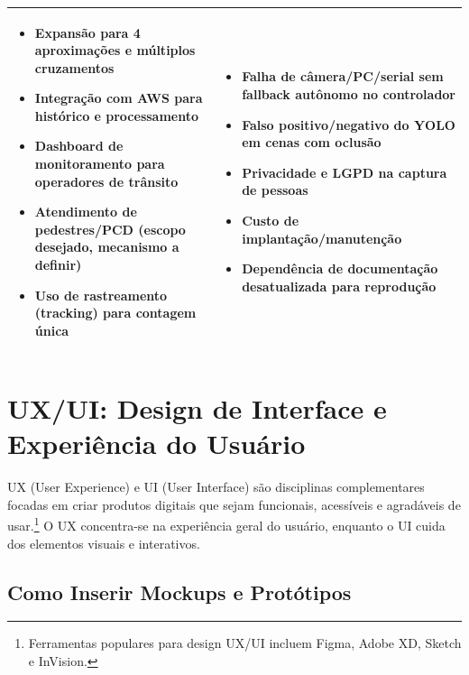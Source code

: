 \documentclass[11pt,a4paper]{article}
\begin{document}
\begin{table}[H]
\begin{tabular}{|p{7.2cm}|p{7.2cm}|}
\hline
\begin{minipage}[t]{7cm}
\begin{itemize}
    \item Expansão para 4 aproximações e múltiplos cruzamentos
    \item Integração com AWS para histórico e processamento
    \item Dashboard de monitoramento para operadores de trânsito
    \item Atendimento de pedestres/PCD (escopo desejado, mecanismo a definir)
    \item Uso de rastreamento (tracking) para contagem única
\end{itemize}
\end{minipage}
&
\begin{minipage}[t]{7cm}
\begin{itemize}
    \item Falha de câmera/PC/serial sem fallback autônomo no controlador 
    \item Falso positivo/negativo do YOLO em cenas com oclusão
    \item Privacidade e LGPD na captura de pessoas
    \item Custo de implantação/manutenção 
    \item Dependência de documentação desatualizada para reprodução
\end{itemize}
\end{minipage}
\\
\hline
\end{tabular}
\end{table}

\section{UX/UI: Design de Interface e Experiência do Usuário}

UX (User Experience) e UI (User Interface) \cite{silva2025} são disciplinas complementares focadas em criar produtos digitais que sejam funcionais, acessíveis e agradáveis de usar.\footnote{Ferramentas populares para design UX/UI incluem Figma, Adobe XD, Sketch e InVision.} O UX concentra-se na experiência geral do usuário, enquanto o UI cuida dos elementos visuais e interativos.

\subsection{Como Inserir Mockups e Protótipos}
\end{document}
